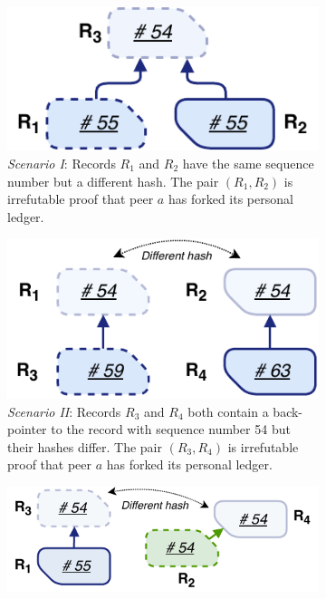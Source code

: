 \begin{figure}[t!]
	\centering
	\begin{subfigure}[t]{.5\textwidth}
		\centering
		\captionsetup{width=.9\linewidth}
		\includegraphics[width=.75\linewidth]{trustchain/assets/fraud_scenario_1}
		\caption{\emph{Scenario I}: Records $ R_1 $ and $ R_2 $ have the same sequence number but a different hash. The pair $ (R_1, R_2) $ is irrefutable proof that peer $ a $ has forked its personal ledger.}
		\label{fig:fraud_scenario_1}
	\end{subfigure}%
	\begin{subfigure}[t]{.5\textwidth}
		\centering
		\captionsetup{width=.89\linewidth}
		\includegraphics[width=.75\linewidth]{trustchain/assets/fraud_scenario_2}
		\caption{\emph{Scenario II}: Records $ R_3 $ and $ R_4 $ both contain a back-pointer to the record with sequence number 54 but their hashes differ. The pair $ (R_3, R_4) $ is irrefutable proof that peer $ a $ has forked its personal ledger.}
		\label{fig:fraud_scenario_2}\vspace{0.9cm}
	\end{subfigure}
	\begin{subfigure}[t]{.5\textwidth}
		\centering
		\captionsetup{width=.89\linewidth}
		\includegraphics[width=\linewidth]{trustchain/assets/fraud_scenario_3}

\end{subfigure}
\end{figure}
